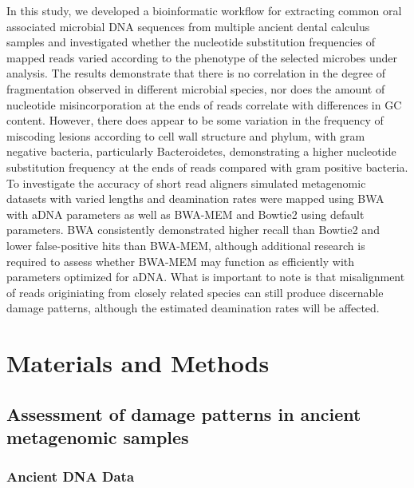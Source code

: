 \documentclass[12pt, a4paper]{article}
\begin{document}
In this study, we developed a bioinformatic workflow for extracting common oral associated microbial DNA sequences from multiple ancient dental calculus samples and investigated whether the nucleotide substitution frequencies of mapped reads varied according to the phenotype of the selected microbes under analysis. 
The results demonstrate that there is no correlation in the degree of fragmentation observed in different microbial species, nor does the amount of nucleotide misincorporation at the ends of reads correlate with differences in GC content. 
However, there does appear to be some variation in the frequency of miscoding lesions according to cell wall structure and phylum, with gram negative bacteria, particularly Bacteroidetes, demonstrating a higher nucleotide substitution frequency at the ends of reads compared with gram positive bacteria.
To investigate the accuracy of short read aligners simulated metagenomic datasets with varied lengths and deamination rates were mapped using BWA with aDNA parameters as well as BWA-MEM and Bowtie2 using default parameters. 
BWA consistently demonstrated higher recall than Bowtie2 and lower false-positive hits than BWA-MEM, although additional research is required to assess whether BWA-MEM may function as efficiently with parameters optimized for aDNA.
What is important to note is that misalignment of reads originiating from closely related species can still produce discernable damage patterns, although the estimated deamination rates will be affected.


\section{Materials and Methods}\label{sec:methods}

\subsection{Assessment of damage patterns in ancient metagenomic samples}

\subsubsection{Ancient DNA Data} %
\end{document}
